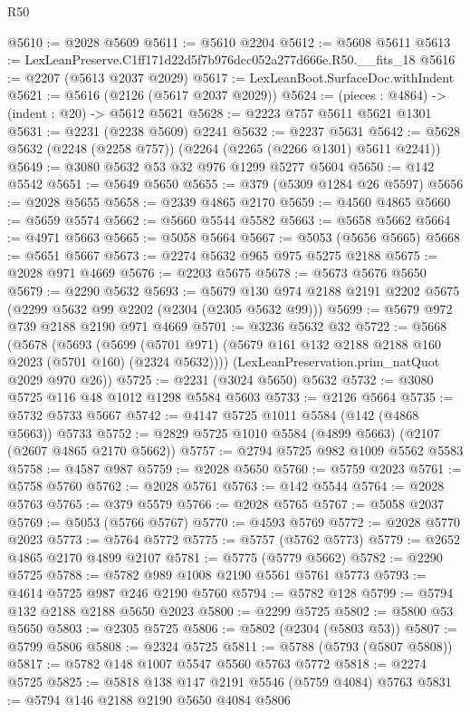 \begin{lexlean}{R50}
\begin{coremodule}
@5610 := @2028 @5609
@5611 := @5610 @2204
@5612 := @5608 @5611
@5613 := LexLeanPreserve.C1ff171d22d5f7b976dcc052a277d666e.R50.__fits_18
@5616 := @2207 (@5613 @2037 @2029)
@5617 := LexLeanBoot.SurfaceDoc.withIndent
@5621 := @5616 (@2126 (@5617 @2037 @2029))
@5624 := (pieces : @4864) -> (indent : @20) -> @5612 @5621
@5628 := @2223 @757 @5611 @5621 @1301
@5631 := @2231 (@2238 @5609) @2241
@5632 := @2237 @5631
@5642 := @5628 @5632 (@2248 (@2258 @757)) (@2264 (@2265 (@2266 @1301) @5611 @2241))
@5649 := @3080 @5632 @53 @32 @976 @1299 @5277 @5604
@5650 := @142 @5542
@5651 := @5649 @5650
@5655 := @379 (@5309 @1284 @26 @5597)
@5656 := @2028 @5655
@5658 := @2339 @4865 @2170
@5659 := @4560 @4865
@5660 := @5659 @5574
@5662 := @5660 @5544 @5582
@5663 := @5658 @5662
@5664 := @4971 @5663
@5665 := @5058 @5664
@5667 := @5053 (@5656 @5665)
@5668 := @5651 @5667
@5673 := @2274 @5632 @965 @975 @5275 @2188
@5675 := @2028 @971 @4669
@5676 := @2203 @5675
@5678 := @5673 @5676 @5650
@5679 := @2290 @5632
@5693 := @5679 @130 @974 @2188 @2191 @2202 @5675 (@2299 @5632 @99 @2202 (@2304 (@2305 @5632 @99)))
@5699 := @5679 @972 @739 @2188 @2190 @971 @4669
@5701 := @3236 @5632 @32
@5722 := @5668
    (@5678
      (@5693
        (@5699 (@5701 @971) (@5679 @161 @132 @2188 @2188 @160 @2023 (@5701 @160) (@2324 @5632))))
      (LexLeanPreservation.prim_natQuot @2029 @970 @26))
@5725 := @2231 (@3024 @5650) @5632
@5732 := @3080 @5725 @116 @48 @1012 @1298 @5584 @5603
@5733 := @2126 @5664
@5735 := @5732 @5733 @5667
@5742 := @4147 @5725 @1011 @5584 (@142 (@4868 @5663)) @5733
@5752 := @2829 @5725 @1010 @5584 (@4899 @5663) (@2107 (@2607 @4865 @2170 @5662))
@5757 := @2794 @5725 @982 @1009 @5562 @5583
@5758 := @4587 @987
@5759 := @2028 @5650
@5760 := @5759 @2023
@5761 := @5758 @5760
@5762 := @2028 @5761
@5763 := @142 @5544
@5764 := @2028 @5763
@5765 := @379 @5579
@5766 := @2028 @5765
@5767 := @5058 @2037
@5769 := @5053 (@5766 @5767)
@5770 := @4593 @5769
@5772 := @2028 @5770 @2023
@5773 := @5764 @5772
@5775 := @5757 (@5762 @5773)
@5779 := @2652 @4865 @2170 @4899 @2107
@5781 := @5775 (@5779 @5662)
@5782 := @2290 @5725
@5788 := @5782 @989 @1008 @2190 @5561 @5761 @5773
@5793 := @4614 @5725 @987 @246 @2190 @5760
@5794 := @5782 @128
@5799 := @5794 @132 @2188 @2188 @5650 @2023
@5800 := @2299 @5725
@5802 := @5800 @53 @5650
@5803 := @2305 @5725
@5806 := @5802 (@2304 (@5803 @53))
@5807 := @5799 @5806
@5808 := @2324 @5725
@5811 := @5788 (@5793 (@5807 @5808))
@5817 := @5782 @148 @1007 @5547 @5560 @5763 @5772
@5818 := @2274 @5725
@5825 := @5818 @138 @147 @2191 @5546 (@5759 @4084) @5763
@5831 := @5794 @146 @2188 @2190 @5650 @4084 @5806

\end{coremodule}
\end{lexlean}
